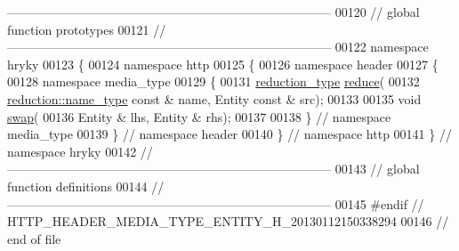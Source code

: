 \begin{DoxyCode}
{      ------------------------------------------------------------------------------}
00120 \textcolor{comment}{// global function prototypes}
00121 \textcolor{comment}{//
      ------------------------------------------------------------------------------}
00122 \textcolor{keyword}{namespace }hryky
00123 \{
00124 \textcolor{keyword}{namespace }http
00125 \{
00126 \textcolor{keyword}{namespace }header
00127 \{
00128 \textcolor{keyword}{namespace }media\_type
00129 \{
00131     \hyperlink{namespacehryky_a343a9a4c36a586be5c2693156200eadc}{reduction_type} \hyperlink{namespacehryky_1_1http_a08fc36a78a8e2908140fcd102829a566}{reduce}(
00132         \hyperlink{namespacehryky_1_1reduction_ac686c30a4c8d196bbd0f05629a6b921f}{reduction::name_type} \textcolor{keyword}{const} & name, Entity \textcolor{keyword}{const} & src);
00133 
00135     \textcolor{keywordtype}{void} \hyperlink{namespacehryky_1_1http_a38e62595ad532d18fbc65ceb61973aec}{swap}(
00136         Entity & lhs, Entity & rhs);
00137 
00138 \} \textcolor{comment}{// namespace media\_type}
00139 \} \textcolor{comment}{// namespace header}
00140 \} \textcolor{comment}{// namespace http}
00141 \} \textcolor{comment}{// namespace hryky}
00142 \textcolor{comment}{//
      ------------------------------------------------------------------------------}
00143 \textcolor{comment}{// global function definitions}
00144 \textcolor{comment}{//
      ------------------------------------------------------------------------------}
00145 \textcolor{preprocessor}{#endif // HTTP\_HEADER\_MEDIA\_TYPE\_ENTITY\_H\_20130112150338294}
00146 \textcolor{preprocessor}{}\textcolor{comment}{// end of file}
\end{DoxyCode}

